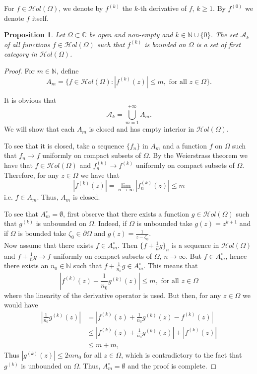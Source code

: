 \documentclass[11pt,twoside,a4paper]{article}
\newtheorem{proposition}[theorem]{Proposition}
\theoremstyle{remark}
\newcommand{\hol}{{\mathcal Hol}}
\newcommand{\holo}{{\mathcal Hol}(\Omega)}
\begin{document}
  For $f \in \holo$, we denote by $f^{(k)}$ the $k$-th derivative of $f$, $k \geq 1$. By $f^{(0)}$ we denote $f$ itself.
  \begin{proposition}
\label{a_k}
  Let $\Omega \subset \mathbb{C}$ be open and non-empty and $k \in \mathbb{N} \cup \{0\}$. The set $\mathcal{A}_k$ of all functions $f \in \hol(\Omega)$ such that $f^{(k)}$ is bounded on $\Omega$ is a set of first category in $\hol(\Omega)$.
\end{proposition}
\begin{proof}
 For $m \in \mathbb{N}$, define
 \begin{equation*}
   A_m = \Big\{ f \in \hol(\Omega): |f^{(k)}(z)| \leq m, \text{ for all } z \in \Omega \Big\}.
 \end{equation*}

 It is obvious that
 \begin{equation*}
 \mathcal{A}_k = \bigcup\limits_{m=1}^{+\infty} A_m .
 \end{equation*}
  We will show that each $A_m$ is closed and has empty interior in $\hol(\Omega)$.
   \par
  To see that it is closed, take a sequence $\{f_n\}$ in $A_m$ and a function $f$ on $\Omega$ such that $f_n \longrightarrow f$ uniformly on compact subsets of $\Omega$. By the Weierstrass theorem we have that $f \in \hol(\Omega)$ and $f^{(k)}_n \longrightarrow f^{(k)}$ uniformly on compact subsets of $\Omega$. Therefore, for any $z \in \Omega$ we have that
  \begin{equation*}
     |f^{(k)}(z)|= \lim\limits_{n \rightarrow \infty} |f^{(k)}_n(z)| \leq m
   \end{equation*}
   i.e. $f \in A_m$. Thus, $A_m$ is closed.
   \par
   To see that $A^{\circ}_m= \emptyset$, first observe that there exists a function $g \in \hol(\Omega)$ such that $g^{(k)}$ is unbounded on $\Omega$. Indeed, if $\Omega$ is unbounded take $g(z)=z^{k+1}$ and if $\Omega$ is bounded take $\zeta_0 \in \partial \Omega$ and $g(z)= \frac{1}{z-\zeta_0}$.\\
  Now assume that there exists $f \in A_m^{\circ}$. Then $\{f+\tfrac{1}{n}g\}_n$ is a sequence in $\hol(\Omega)$ and $f+\frac{1}{n}g \longrightarrow f$ uniformly on compact subsets of $\Omega$,  $n\rightarrow \infty$. But $f \in A_m^{\circ}$, hence there exists an $n_0 \in \mathbb{N}$ such that $f+ \tfrac{1}{n_0}g \in A_m^{\circ}$. This means that
  \begin{equation*}
    |f^{(k)}(z)+\frac{1}{n_0}g^{(k)}(z)| \leq m, \text{ for all } z \in \Omega
  \end{equation*}
where the linearity of the derivative operator is used.
  But then, for any $z \in \Omega$ we would have
  \begin{align*}
    |\frac{1}{n_0}g^{(k)}(z)| &= |f^{(k)}(z)+\frac{1}{n_0}g^{(k)}(z)-f^{(k)}(z)| \\
    & \leq |f^{(k)}(z)+\frac{1}{n_0}g^{(k)}(z)| +|f^{(k)}(z)| \\
    & \leq m+m,
  \end{align*}
  Thus $|g^{(k)}(z)| \leq 2mn_0$ for all $z \in \Omega$, which is contradictory to the fact that $g^{(k)}$ is unbounded on $\Omega$. Thus, $A_m^{\circ} = \emptyset$ and the proof is complete.
\end{proof}
\end{document}

